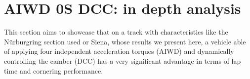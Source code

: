 %

\section{AIWD 0S DCC: in depth analysis}
This section aims to showcase that on a track with characteristics like the N\"{u}rburgring section used or Siena, whose results we present here, a vehicle able of applying four independent acceleration torques (AIWD) and dynamically controlling the camber (DCC) has a very significant advantage in terms of lap time and cornering performance.

